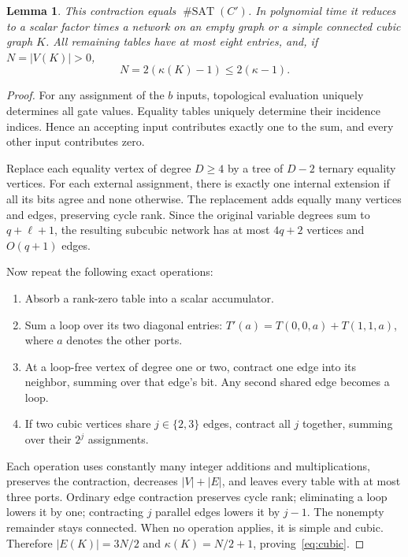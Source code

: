 \documentclass[11pt]{article}
\newtheorem{lemma}[theorem]{Lemma}
\newcommand{\satcount}{\operatorname{\#SAT}}
\begin{document}
\begin{lemma}\label{lem:encoding}
This contraction equals $\satcount(C')$. In polynomial time it reduces
to a scalar factor times a network on an empty graph or a simple
connected cubic graph $K$. All remaining tables have at most eight
entries, and, if $N=|V(K)|>0$,
\begin{equation}\label{eq:cubic}
 N=2(\kappa(K)-1)\le2(\kappa-1).
\end{equation}
\end{lemma}
\begin{proof}
For any assignment of the $b$ inputs, topological evaluation uniquely
determines all gate values. Equality tables uniquely determine their
incidence indices. Hence an accepting input contributes exactly one
to the sum, and every other input contributes zero.

Replace each equality vertex of degree $D\ge4$ by a tree of $D-2$
ternary equality vertices. For each external assignment, there is
exactly one internal extension if all its bits agree and none
otherwise. The replacement adds equally many vertices and edges,
preserving cycle rank. Since the original variable degrees sum to
$q+\ell+1$, the resulting subcubic network has at most $4q+2$
vertices and $O(q+1)$ edges.

Now repeat the following exact operations:
\begin{enumerate}
 \item Absorb a rank-zero table into a scalar accumulator.
 \item Sum a loop over its two diagonal entries:
       $T'(a)=T(0,0,a)+T(1,1,a)$, where $a$ denotes the other ports.
 \item At a loop-free vertex of degree one or two, contract one
       edge into its neighbor, summing over that edge's bit. Any
       second shared edge becomes a loop.
 \item If two cubic vertices share $j\in\{2,3\}$ edges, contract
       all $j$ together, summing over their $2^j$ assignments.
\end{enumerate}
Each operation uses constantly many integer additions and
multiplications, preserves the contraction, decreases $|V|+|E|$,
and leaves every table with at most three ports. Ordinary edge
contraction preserves cycle rank; eliminating a loop lowers it by
one; contracting $j$ parallel edges lowers it by $j-1$.
The nonempty remainder stays connected. When no operation applies,
it is simple and cubic. Therefore $|E(K)|=3N/2$ and
$\kappa(K)=N/2+1$, proving~\eqref{eq:cubic}.
\end{proof}
\end{document}
